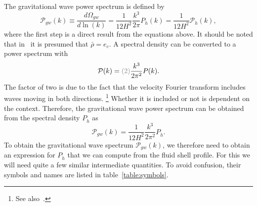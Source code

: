 The gravitational wave power spectrum is defined by
\cite[eq. 3.45]{hindmarsh_gw_pt_2019}
\begin{equation}
\mathcal{P}_{gw}(k)
\equiv \frac{d \Omega_{gw}}{d \ln (k)}
= \frac{1}{12 H^2} \frac{k^3}{2\pi} P_{\dot{h}}(k)
= \frac{1}{12 H^2} \mathcal{P}_{\dot{h}}(k),
\label{eq:gw_pow_spec}
\end{equation}
where the first step is a direct result from the equations above.
It should be noted that in~\cite[eq. 3.6, eq. 3.46]{hindmarsh_gw_pt_2019} it is presumed that $\bar{\rho}=e_c$.
A spectral density can be converted to a power spectrum with
\cite[eq. 4.18]{hindmarsh_gw_pt_2019}
\begin{equation}
\mathcal{P}(k) = \textcolor{gray}{(2)} \frac{k^3}{2 \pi^2} P(k).
\label{eq:pow_spec}
\end{equation}
The factor of two is due to the fact that the velocity Fourier transform includes waves moving in both directions.%
\footnote{See also~\cite[p. 338]{maggiore_gw_2008}.}
Whether it is included or not is dependent on the context.
Therefore, the gravitational wave power spectrum can be obtained from the spectral density $P_{\dot{h}}$ as
\begin{equation}
\mathcal{P}_{gw}(k) = \frac{1}{12 H^2} \frac{k^3}{2\pi^2} P_{\dot{h}}.
\label{eq:gw_pow_spec2}
\end{equation}
To obtain the gravitational wave spectrum $\mathcal{P}_{gw}(k)$,
we therefore need to obtain an expression for $P_{\dot{h}}$ that we can compute from the fluid shell profile.
For this we will need quite a few similar intermediate quantities.
To avoid confusion, their symbols and names are listed in table~\ref{table:symbols}.

